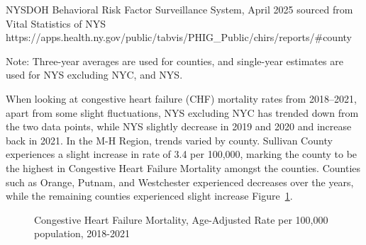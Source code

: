 \documentclass[
  english,
  letterpaper,
]{report}
\begin{document}
\begin{tcolorbox}[enhanced jigsaw, breakable, leftrule=.75mm, title=\textcolor{quarto-callout-note-color}{\faInfo}\hspace{0.5em}{Source}, bottomrule=.15mm, opacityback=0, left=2mm, colback=white, bottomtitle=1mm, coltitle=black, colbacktitle=quarto-callout-note-color!10!white, colframe=quarto-callout-note-color-frame, opacitybacktitle=0.6, toptitle=1mm, titlerule=0mm, arc=.35mm, rightrule=.15mm, toprule=.15mm]

NYSDOH Behavioral Risk Factor Surveillance System, April 2025 sourced
from Vital Statistics of NYS
https://apps.health.ny.gov/public/tabvis/PHIG\_Public/chirs/reports/\#county

\end{tcolorbox}

\begin{tcolorbox}[enhanced jigsaw, breakable, leftrule=.75mm, title=\textcolor{quarto-callout-note-color}{\faInfo}\hspace{0.5em}{Note}, bottomrule=.15mm, opacityback=0, left=2mm, colback=white, bottomtitle=1mm, coltitle=black, colbacktitle=quarto-callout-note-color!10!white, colframe=quarto-callout-note-color-frame, opacitybacktitle=0.6, toptitle=1mm, titlerule=0mm, arc=.35mm, rightrule=.15mm, toprule=.15mm]

Note: Three-year averages are used for counties, and single-year
estimates are used for NYS excluding NYC, and NYS.

\end{tcolorbox}

When looking at congestive heart failure (CHF) mortality rates from
2018--2021, apart from some slight fluctuations, NYS excluding NYC has
trended down from the two data points, while NYS slightly decrease in
2019 and 2020 and increase back in 2021. In the M-H Region, trends
varied by county. Sullivan County experiences a slight increase in rate
of 3.4 per 100,000, marking the county to be the highest in Congestive
Heart Failure Mortality amongst the counties. Counties such as Orange,
Putnam, and Westchester experienced decreases over the years, while the
remaining counties experienced slight increase
Figure~\ref{fig-congheartfail-mortal-aar-2}.

\begin{figure}


\caption{\label{fig-congheartfail-mortal-aar-2}Congestive Heart Failure
Mortality, Age-Adjusted Rate per 100,000 population, 2018-2021}

\end{figure}%
\end{document}
